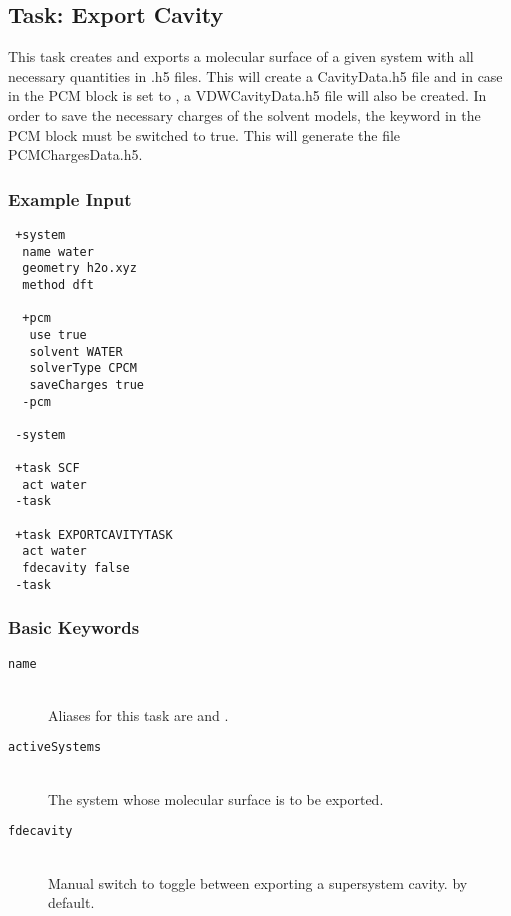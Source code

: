 \subsection{Task: Export Cavity}\label{sec:tasks:ExportCavityTask}
This task creates and exports a molecular surface of a given system with all necessary quantities in .h5 files.
This will create a CavityData.h5  file and in case  in the PCM block is set to , a VDWCavityData.h5 file will also be created.
In order to save the necessary charges of the solvent models, the keyword  in the PCM block must be switched to true. This will generate the file PCMChargesData.h5.
\subsubsection{Example Input}
\begin{lstlisting}
 +system
  name water
  geometry h2o.xyz
  method dft

  +pcm
   use true
   solvent WATER
   solverType CPCM
   saveCharges true
  -pcm

 -system

 +task SCF
  act water
 -task

 +task EXPORTCAVITYTASK
  act water
  fdecavity false
 -task
\end{lstlisting}

\subsubsection{Basic Keywords}
\begin{description}
\item [\texttt{name}]\hfill \\
  Aliases for this task are  and .
\item [\texttt{activeSystems}]\hfill \\
  The system whose molecular surface is to be exported.
\item [\texttt{fdecavity}]\hfill \\
  Manual switch to toggle between exporting a supersystem cavity.  by default.
\end{description}
